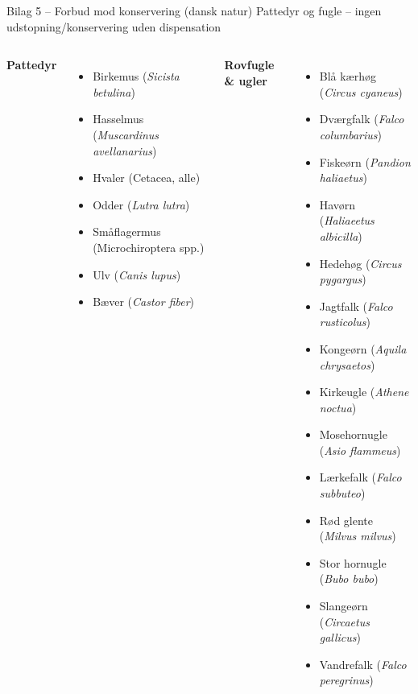 \begin{frame}{Bilag 5 – Forbud mod konservering (dansk natur)}
\tiny
Pattedyr og fugle – ingen udstopning/konservering uden dispensation

\begin{columns}[T]
\textbf{Pattedyr}
\begin{itemize}
  \item Birkemus (\textit{Sicista betulina})
  \item Hasselmus (\textit{Muscardinus avellanarius})
  \item Hvaler (Cetacea, alle)
  \item Odder (\textit{Lutra lutra})
  \item Småflagermus (Microchiroptera spp.)
  \item Ulv (\textit{Canis lupus})
  \item Bæver (\textit{Castor fiber})
\end{itemize}

\textbf{Rovfugle \& ugler}
\begin{itemize}
  \item Blå kærhøg (\textit{Circus cyaneus})
  \item Dværgfalk (\textit{Falco columbarius})
  \item Fiskeørn (\textit{Pandion haliaetus})
  \item Havørn (\textit{Haliaeetus albicilla})
  \item Hedehøg (\textit{Circus pygargus})
  \item Jagtfalk (\textit{Falco rusticolus})
  \item Kongeørn (\textit{Aquila chrysaetos})
  \item Kirkeugle (\textit{Athene noctua})
  \item Mosehornugle (\textit{Asio flammeus})
  \item Lærkefalk (\textit{Falco subbuteo})
  \item Rød glente (\textit{Milvus milvus})
  \item Stor hornugle (\textit{Bubo bubo})
  \item Slangeørn (\textit{Circaetus gallicus})
  \item Vandrefalk (\textit{Falco peregrinus})
\end{itemize}


\end{columns}
\end{frame}
